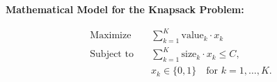 \documentclass{article}
\begin{document}
\textbf{Mathematical Model for the Knapsack Problem:}

\begin{align*}
    \text{Maximize} \quad & \sum_{k=1}^{K} \text{value}_k \cdot x_k \\
    \text{Subject to} \quad & \sum_{k=1}^{K} \text{size}_k \cdot x_k \leq C, \\
    & x_k \in \{0, 1\} \quad \text{for } k = 1, \ldots, K.
\end{align*}
\end{document}
